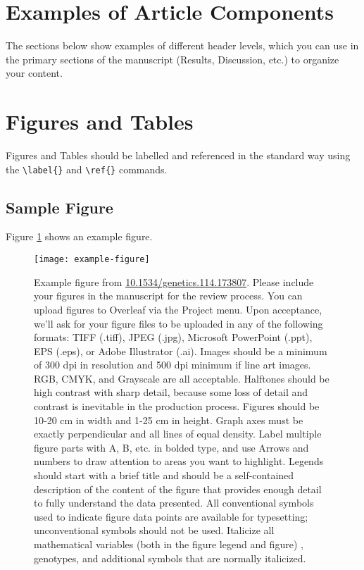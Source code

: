 \documentclass[9pt,twocolumn,twoside,lineno]{gsajnl}
\begin{document}
\section{Examples of Article Components}
\label{sec:examples}

The sections below show examples of different header levels, which you can use in the primary sections of the manuscript (Results, Discussion, etc.) to organize your content.

\section{Figures and Tables}

Figures and Tables should be labelled and referenced in the standard way using the \verb|\label{}| and \verb|\ref{}| commands.

\subsection{Sample Figure}

Figure \ref{fig:spectrum} shows an example figure.

\begin{figure}[htbp]
\centering
\texttt{[image: example-figure]}
\caption{Example figure from \url{10.1534/genetics.114.173807}. Please include your figures in the manuscript for the review process. You can upload figures to Overleaf via the Project menu. Upon acceptance, we'll ask for your figure files to be uploaded in any of the following formats: TIFF (.tiff), JPEG (.jpg), Microsoft PowerPoint (.ppt), EPS (.eps), or Adobe Illustrator (.ai).  Images should be a minimum of 300 dpi in resolution and 500 dpi minimum if line art images.  RGB, CMYK, and Grayscale are all acceptable. Halftones should be high contrast with sharp detail, because some loss of detail and contrast is inevitable in the production process. Figures should be 10-20 cm in width and 1-25 cm in height. Graph axes must be exactly perpendicular and all lines of equal density.
Label multiple figure parts with A, B, etc. in bolded type, and use Arrows and numbers to draw attention to areas you want to highlight. Legends should start with a brief title and should be a self-contained description of the content of the figure that provides enough detail to fully understand the data presented. All conventional symbols used to indicate figure data points are available for typesetting; unconventional symbols should not be used. Italicize all mathematical variables (both in the figure legend and figure) , genotypes, and additional symbols that are normally italicized.  
}%
\label{fig:spectrum}
\end{figure}
\end{document}
